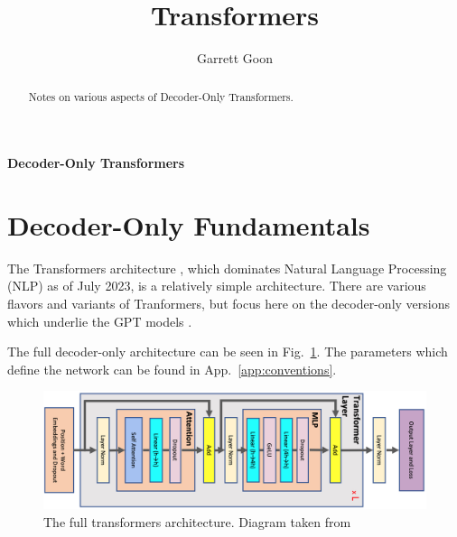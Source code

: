\documentclass[11pt]{article}
\title{Transformers}
\author{Garrett Goon}
\begin{document}
%

\vspace{1truecm}
%
%
\renewcommand{\thefootnote}{\fnsymbol{footnote}}
\begin{center}
{\huge \bf{Decoder-Only Transformers}}
\end{center}


\begin{abstract}

Notes on various aspects of Decoder-Only Transformers.

\end{abstract}

\tableofcontents


\renewcommand*{\thefootnote}{\arabic{footnote}}
\setcounter{footnote}{0}



\section{Decoder-Only Fundamentals \label{sec:decoder_only} }

The Transformers architecture \cite {vaswani2017attention}, which dominates Natural Language
Processing (NLP) as of July 2023, is a relatively simple architecture. There are various flavors and
variants of Tranformers, but focus here on the decoder-only versions which underlie the
GPT models \cite {gpt2radford2019language, gpt3brown2020language, gpt4openai2023}.

The full decoder-only architecture can be seen in Fig.~\ref{fig:transformers_architecture}. The
parameters which define the network can be found in App.~\ref{app:conventions}.
\begin{figure}[h]
    \centering
    \includegraphics[scale=0.28]{figures/transformer-general.jpg}
    \caption{The full transformers architecture. Diagram taken from \cite{korthikanti2022reducing} }
    \label{fig:transformers_architecture}
\end{figure}
\end{document}
